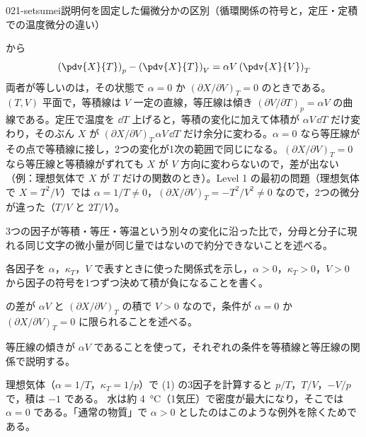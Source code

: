 \documentclass[uplatex,dvipdfmx,a4paper,11pt]{jsarticle}
\begin{document}
\begin{mondai}{021-setsumei}{説明}{何を固定した偏微分かの区別（循環関係の符号と，定圧・定積での温度微分の違い）}
\begin{tadashii}
  から
\[ \left(\pdv{X}{T}\right)_{p} - \left(\pdv{X}{T}\right)_{V} = \alpha V\left(\pdv{X}{V}\right)_{T} \]
両者が等しいのは，その状態で $\alpha = 0$ か $(\partial X/\partial V)_{T} = 0$ のときである。$(T,V)$ 平面で，等積線は $V$ 一定の直線，等圧線は傾き $(\partial V/\partial T)_{p} = \alpha V$ の曲線である。定圧で温度を $\dd T$ 上げると，等積の変化に加えて体積が $\alpha V\,\dd T$ だけ変わり，そのぶん $X$ が $(\partial X/\partial V)_{T}\,\alpha V\,\dd T$ だけ余分に変わる。$\alpha = 0$ なら等圧線がその点で等積線に接し，2つの変化が1次の範囲で同じになる。$(\partial X/\partial V)_{T} = 0$ なら等圧線と等積線がずれても $X$ が $V$ 方向に変わらないので，差が出ない（例：理想気体で $X$ が $T$ だけの関数のとき）。Level 1 の最初の問題（理想気体で $X = T^{2}/V$）では $\alpha = 1/T \neq 0$，$(\partial X/\partial V)_{T} = -T^{2}/V^{2} \neq 0$ なので，2つの微分が違った（$T/V$ と $2T/V$）。
\begin{ronten}
  \item {} 3つの因子が等積・等圧・等温という別々の変化に沿った比で，分母と分子に現れる同じ文字の微小量が同じ量ではないので約分できないことを述べる。
  \item {} 各因子を $\alpha$，$\kappa_{T}$，$V$ で表すときに使った関係式を示し，$\alpha > 0$，$\kappa_{T} > 0$，$V > 0$ から因子の符号を1つずつ決めて積が負になることを書く。
  \item {}  の差が $\alpha V$ と $(\partial X/\partial V)_{T}$ の積で $V > 0$ なので，条件が $\alpha = 0$ か $(\partial X/\partial V)_{T} = 0$ に限られることを述べる。
  \item {} 等圧線の傾きが $\alpha V$ であることを使って，それぞれの条件を等積線と等圧線の関係で説明する。
\end{ronten}
\kenzan 理想気体（$\alpha = 1/T$，$\kappa_{T} = 1/p$）で (1) の3因子を計算すると $p/T$，$T/V$，$-V/p$ で，積は $-1$ である。
\tsumazuki 水は約 \qty{4}{\degreeCelsius}（1気圧）で密度が最大になり，そこでは $\alpha = 0$ である。「通常の物質」で $\alpha > 0$ としたのはこのような例外を除くためである。
\end{tadashii}
\end{mondai}
\end{document}
